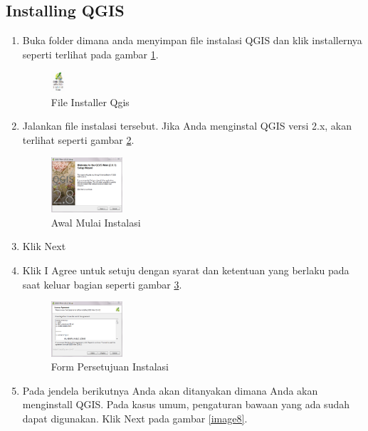 \subsection{Installing QGIS}
\begin{enumerate}
\item
Buka folder dimana anda menyimpan file instalasi QGIS dan klik installernya seperti terlihat pada gambar \ref{image5}.
\begin{figure}[ht]
        \centerline{\includegraphics[width=0.05\textwidth]{figures/image5}}
        \caption{File Installer Qgis}
        \label{image5}
        \end{figure}
\item
Jalankan file instalasi tersebut. Jika Anda menginstal QGIS versi 2.x, akan terlihat seperti gambar \ref{image6}.
\begin{figure}[ht]
        \centerline{\includegraphics[width=0.25\textwidth]{figures/image6}}
        \caption{Awal Mulai Instalasi}
        \label{image6}
        \end{figure}
\item 
Klik Next
\item
Klik I Agree untuk setuju dengan syarat dan ketentuan yang berlaku pada saat keluar bagian seperti gambar \ref{image7}.
\begin{figure}[ht]
        \centerline{\includegraphics[width=0.25\textwidth]{figures/image7}}
        \caption{Form Persetujuan Instalasi}
        \label{image7}
        \end{figure}
\item
Pada jendela berikutnya Anda akan ditanyakan dimana Anda akan menginstall QGIS. Pada kasus umum, pengaturan bawaan yang ada sudah dapat digunakan. Klik Next pada gambar \ref{image8}.
\begin{figure}[ht]

\end{figure}
\end{enumerate}
